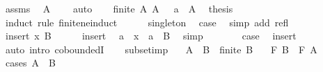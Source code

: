 \begin{isabellebody}
\ assms\ \isamarkupfalse%
\ {\isachardoublequoteopen}A\ {\isasymnoteq}\ {\isacharbraceleft}{\kern0pt}{\isacharbraceright}{\kern0pt}{\isachardoublequoteclose}\ \isamarkupfalse%
\ auto\isanewline
\ \ \isamarkupfalse%
\ {\isacartoucheopen}finite\ A{\isacartoucheclose}\ {\isacartoucheopen}A\ {\isasymnoteq}\ {\isacharbraceleft}{\kern0pt}{\isacharbraceright}{\kern0pt}{\isacartoucheclose}\ {\isacartoucheopen}a\ {\isasymin}\ A{\isacartoucheclose}\ \isamarkupfalse%
\ {\isacharquery}{\kern0pt}thesis\isanewline
\ \ \isamarkupfalse%
\ {\isacharparenleft}{\kern0pt}induct\ rule{\isacharcolon}{\kern0pt}\ finite{\isacharunderscore}{\kern0pt}ne{\isacharunderscore}{\kern0pt}induct{\isacharparenright}{\kern0pt}\isanewline
\ \ \ \ \isamarkupfalse%
\ singleton\ \isamarkupfalse%
\ {\isacharquery}{\kern0pt}case\ \isamarkupfalse%
\ {\isacharparenleft}{\kern0pt}simp\ add{\isacharcolon}{\kern0pt}\ refl{\isacharparenright}{\kern0pt}\isanewline
\ \ \isamarkupfalse%
\isanewline
\ \ \ \ \isamarkupfalse%
\ {\isacharparenleft}{\kern0pt}insert\ x\ B{\isacharparenright}{\kern0pt}\isanewline
\ \ \ \ \isamarkupfalse%
\ insert\ \isamarkupfalse%
\ {\isachardoublequoteopen}a\ {\isacharequal}{\kern0pt}\ x\ {\isasymor}\ a\ {\isasymin}\ B{\isachardoublequoteclose}\ \isamarkupfalse%
\ simp\isanewline
\ \ \ \ \isamarkupfalse%
\ \isamarkupfalse%
\ {\isacharquery}{\kern0pt}case\ \isamarkupfalse%
\ insert\ \isamarkupfalse%
\ {\isacharparenleft}{\kern0pt}auto\ intro{\isacharcolon}{\kern0pt}\ coboundedI{}{\isacharparenright}{\kern0pt}\isanewline
\ \ \isamarkupfalse%
\isanewline
{}\isamarkupfalse%
%
\endisatagproof
{\isafoldproof}%
%
\isadelimproof
\isanewline
%
\endisadelimproof
\isanewline
{}\isamarkupfalse%
\ subset{\isacharunderscore}{\kern0pt}imp{\isacharcolon}{\kern0pt}\isanewline
\ \ \ {\isachardoublequoteopen}A\ {\isasymsubseteq}\ B{\isachardoublequoteclose}\ \ {\isachardoublequoteopen}finite\ B{\isachardoublequoteclose}\isanewline
\ \ \ {\isachardoublequoteopen}F\ B\ \isactrlbold {\isasymle}\ F\ A{\isachardoublequoteclose}\isanewline
%
\isadelimproof
%
\endisadelimproof
%
\isatagproof
{}\isamarkupfalse%
\ {\isacharparenleft}{\kern0pt}cases\ {\isachardoublequoteopen}A\ {\isacharequal}{\kern0pt}\ B{\isachardoublequoteclose}{\isacharparenright}{\kern0pt}\isanewline

\end{isabellebody}
